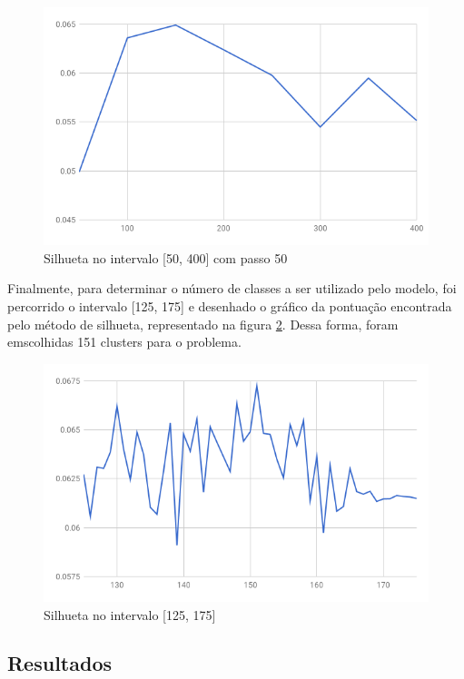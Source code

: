 \documentclass[conference]{IEEEtran}
\begin{document}
\begin{figure}[H]
  \includegraphics[scale=0.4, center]{silhouette1.png}
  \caption{Silhueta no intervalo [50, 400] com passo 50}
  \label{fig:sil1}
\end{figure}

Finalmente, para determinar o número de classes a ser utilizado pelo modelo, foi percorrido o intervalo [125, 175] e desenhado o gráfico da pontuação encontrada pelo método de silhueta, representado na figura \ref{fig:sil2}. Dessa forma, foram emscolhidas 151 clusters para o problema. 

\begin{figure}[H]
  \includegraphics[scale=0.4, center]{silhouette2.png}
  \caption{Silhueta no intervalo [125, 175]}
  \label{fig:sil2}
\end{figure}

\subsection {Resultados}
\end{document}
